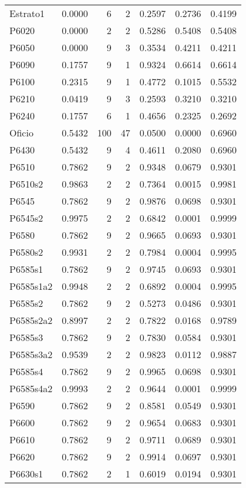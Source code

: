 \begin{longtable}{lrrrrrr}
Estrato1 & 0.0000 & 6 & 2 & 0.2597 & 0.2736 & 0.4199 \\
P6020 & 0.0000 & 2 & 2 & 0.5286 & 0.5408 & 0.5408 \\
P6050 & 0.0000 & 9 & 3 & 0.3534 & 0.4211 & 0.4211 \\
P6090 & 0.1757 & 9 & 1 & 0.9324 & 0.6614 & 0.6614 \\
P6100 & 0.2315 & 9 & 1 & 0.4772 & 0.1015 & 0.5532 \\
P6210 & 0.0419 & 9 & 3 & 0.2593 & 0.3210 & 0.3210 \\
P6240 & 0.1757 & 6 & 1 & 0.4656 & 0.2325 & 0.2692 \\
Oficio & 0.5432 & 100 & 47 & 0.0500 & 0.0000 & 0.6960 \\
P6430 & 0.5432 & 9 & 4 & 0.4611 & 0.2080 & 0.6960 \\
P6510 & 0.7862 & 9 & 2 & 0.9348 & 0.0679 & 0.9301 \\
P6510s2 & 0.9863 & 2 & 2 & 0.7364 & 0.0015 & 0.9981 \\
P6545 & 0.7862 & 9 & 2 & 0.9876 & 0.0698 & 0.9301 \\
P6545s2 & 0.9975 & 2 & 2 & 0.6842 & 0.0001 & 0.9999 \\
P6580 & 0.7862 & 9 & 2 & 0.9665 & 0.0693 & 0.9301 \\
P6580s2 & 0.9931 & 2 & 2 & 0.7984 & 0.0004 & 0.9995 \\
P6585s1 & 0.7862 & 9 & 2 & 0.9745 & 0.0693 & 0.9301 \\
P6585s1a2 & 0.9948 & 2 & 2 & 0.6892 & 0.0004 & 0.9995 \\
P6585s2 & 0.7862 & 9 & 2 & 0.5273 & 0.0486 & 0.9301 \\
P6585s2a2 & 0.8997 & 2 & 2 & 0.7822 & 0.0168 & 0.9789 \\
P6585s3 & 0.7862 & 9 & 2 & 0.7830 & 0.0584 & 0.9301 \\
P6585s3a2 & 0.9539 & 2 & 2 & 0.9823 & 0.0112 & 0.9887 \\
P6585s4 & 0.7862 & 9 & 2 & 0.9965 & 0.0698 & 0.9301 \\
P6585s4a2 & 0.9993 & 2 & 2 & 0.9644 & 0.0001 & 0.9999 \\
P6590 & 0.7862 & 9 & 2 & 0.8581 & 0.0549 & 0.9301 \\
P6600 & 0.7862 & 9 & 2 & 0.9654 & 0.0683 & 0.9301 \\
P6610 & 0.7862 & 9 & 2 & 0.9711 & 0.0689 & 0.9301 \\
P6620 & 0.7862 & 9 & 2 & 0.9914 & 0.0697 & 0.9301 \\
P6630s1 & 0.7862 & 2 & 1 & 0.6019 & 0.0194 & 0.9301 \\

\end{longtable}
